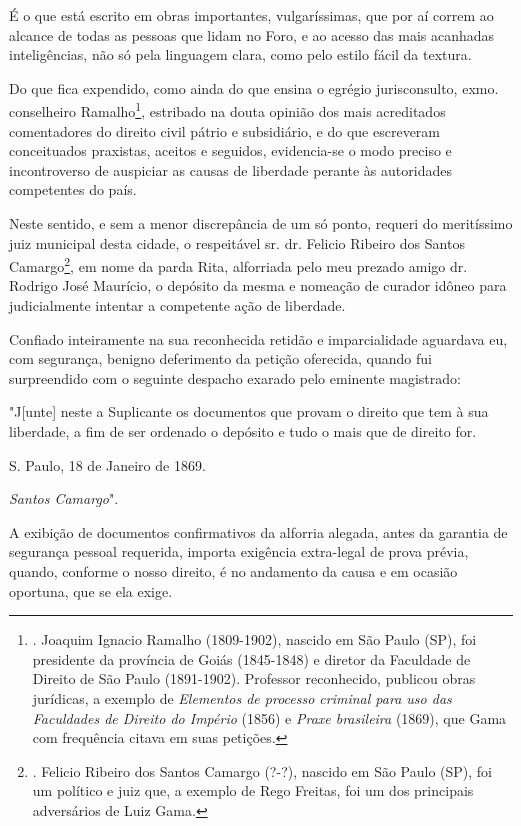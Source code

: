 É o que está escrito em obras importantes, vulgaríssimas, que por aí
correm ao alcance de todas as pessoas que lidam no Foro, e ao acesso das
mais acanhadas inteligências, não só pela linguagem clara, como pelo
estilo fácil da textura.

Do que fica expendido, como ainda do que ensina o egrégio jurisconsulto,
exmo. conselheiro Ramalho\footnote{. Joaquim Ignacio Ramalho
  (1809-1902), nascido em São Paulo (SP), foi presidente da província de
  Goiás (1845-1848) e diretor da Faculdade de Direito de São Paulo
  (1891-1902). Professor reconhecido, publicou obras jurídicas, a
  exemplo de \emph{Elementos de processo criminal para uso das
  Faculdades de Direito do Império} (1856) e \emph{Praxe brasileira}
  (1869), que Gama com frequência citava em suas petições.}, estribado
na douta opinião dos mais acreditados comentadores do direito civil
pátrio e subsidiário, e do que escreveram conceituados praxistas,
aceitos e seguidos, evidencia-se o modo preciso e incontroverso de
auspiciar as causas de liberdade perante às autoridades competentes do
país.

Neste sentido, e sem a menor discrepância de um só ponto, requeri do
meritíssimo juiz municipal desta cidade, o respeitável sr. dr. Felicio
Ribeiro dos Santos Camargo\footnote{. Felicio Ribeiro dos Santos Camargo
  (?-?), nascido em São Paulo (SP), foi um político e juiz que, a
  exemplo de Rego Freitas, foi um dos principais adversários de Luiz
  Gama.}, em nome da parda Rita, alforriada pelo meu prezado amigo dr.
Rodrigo José Maurício, o depósito da mesma e nomeação de curador idôneo
para judicialmente intentar a competente ação de liberdade.

Confiado inteiramente na sua reconhecida retidão e imparcialidade
aguardava eu, com segurança, benigno deferimento da petição oferecida,
quando fui surpreendido com o seguinte despacho exarado pelo eminente
magistrado:

"J{[}unte{]} neste a Suplicante os documentos que provam o direito que
tem à sua liberdade, a fim de ser ordenado o depósito e tudo o mais que
de direito for.

S. Paulo, 18 de Janeiro de 1869.

\emph{Santos Camargo}".

A exibição de documentos confirmativos da alforria alegada, antes da
garantia de segurança pessoal requerida, importa exigência extra-legal
de prova prévia, quando, conforme o nosso direito, é no andamento da
causa e em ocasião oportuna, que se ela exige.

